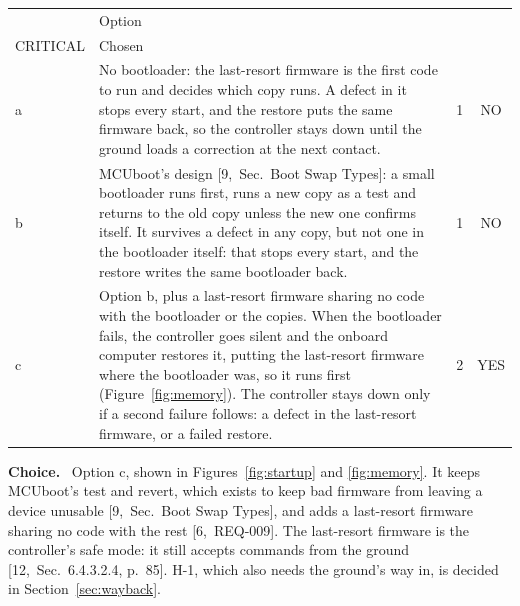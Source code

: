 \documentclass[11pt,a4paper]{article}
\makeatletter
\newcommand{\sev}[2]{\begin{tabular}[b]{@{}c@{}}#1\\{\scriptsize #2}\end{tabular}}
\newcommand{\field}[1]{\par\needspace{4\baselineskip}\smallskip\noindent\textbf{#1.}~}
\makeatother
\begin{document}
\smallskip
{\small\noindent\begin{tabularx}{\textwidth}{@{}l>{\raggedright\arraybackslash}Xcc@{}}
\toprule
 & Option & \sev{H-8}{CRITICAL} & Chosen \\
\midrule
a & No bootloader: the last-resort firmware is the first code to run and decides which copy runs. A defect in it stops every start, and the restore puts the same firmware back, so the controller stays down until the ground loads a correction at the next contact. & 1 & NO \\
b & MCUboot's design [9,~Sec.~Boot Swap Types]: a small bootloader runs first, runs a new copy as a test and returns to the old copy unless the new one confirms itself. It survives a defect in any copy, but not one in the bootloader itself: that stops every start, and the restore writes the same bootloader back. & 1 & NO \\
c & Option b, plus a last-resort firmware sharing no code with the bootloader or the copies. When the bootloader fails, the controller goes silent and the onboard computer restores it, putting the last-resort firmware where the bootloader was, so it runs first (Figure~\ref{fig:memory}). The controller stays down only if a second failure follows: a defect in the last-resort firmware, or a failed restore. & 2 & YES \\
\bottomrule
\end{tabularx}}


\field{Choice} Option c, shown in Figures~\ref{fig:startup} and
\ref{fig:memory}. It keeps MCUboot's test and revert, which exists to keep bad
firmware from leaving a device unusable [9,~Sec.~Boot Swap Types], and adds a
last-resort firmware sharing no code with the rest [6,~REQ-009]. The
last-resort firmware is the controller's safe mode: it still accepts commands
from the ground [12,~Sec.~6.4.3.2.4, p.~85]. H-1, which also needs the
ground's way in, is decided in Section~\ref{sec:wayback}.
\end{document}
